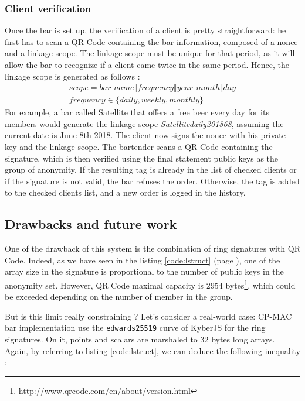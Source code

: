 \subsubsection{Client verification}
\label{subsubsec:bar_client_verif}
Once the bar is set up, the verification of a client is pretty straightforward: he first has to scan a QR Code containing the bar information, composed of a nonce and a linkage scope. The linkage scope must be unique for that period, as it will allow the bar to recognize if a client came twice in the same period. Hence, the linkage scope is generated as follows :
\begin{gather}
scope = bar\_name \Vert frequency \Vert year \Vert month \Vert day \\
frequency \in \lbrace daily, weekly, monthly \rbrace \nonumber
\end{gather}
For example, a bar called Satellite that offers a free beer every day for its members would generate the linkage scope \textit{Satellitedaily201868}, assuming the current date is June 8th 2018. The client now signs the nonce with his private key and the linkage scope. The bartender scans a QR Code containing the signature, which is then verified using the final statement public keys as the group of anonymity. If the resulting tag is already in the list of checked clients or if the signature is not valid, the bar refuses the order. Otherwise, the tag is added to the checked clients list, and a new order is logged in the history.

\subsection{Drawbacks and future work}
One of the drawback of this system is the combination of ring signatures with QR Code. Indeed, as we have seen in the listing \ref{code:lstruct} (page \pageref{code:ustruct}), one of the array size in the signature is proportional to the number of public keys in the anonymity set. However, QR Code maximal capacity is $2954$ bytes\footnote{\url{http://www.qrcode.com/en/about/version.html}}, which could be exceeded depending on the number of member in the group.

But is this limit really constraining ? Let's consider a real-world case: CP-MAC bar implementation use the \texttt{edwards25519} curve of KyberJS for the ring signatures. On it, points and scalars are marshaled to 32 bytes long arrays. Again, by referring to listing \ref{code:lstruct}, we can deduce the following inequality :

